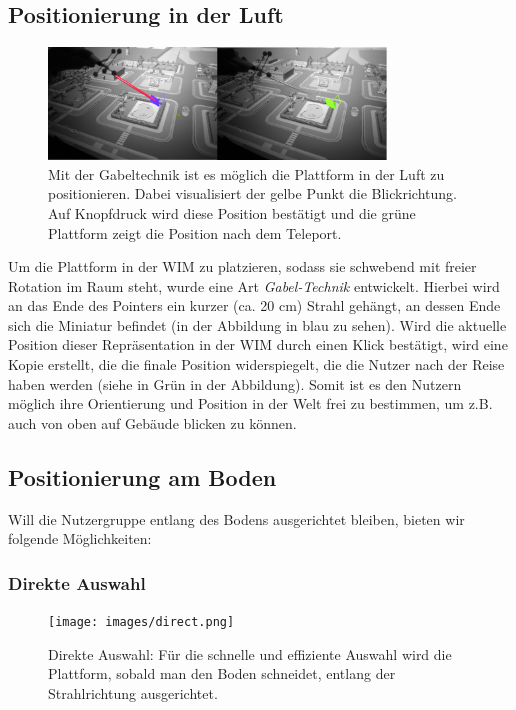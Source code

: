 \subsection{Positionierung in der Luft}

\begin{figure}[h!]
  \centering
  \includegraphics[width=0.8\textwidth]{images/fork.png}
  \caption{Mit der Gabeltechnik ist es möglich die Plattform in der Luft zu positionieren. Dabei visualisiert der gelbe Punkt die Blickrichtung. Auf Knopfdruck wird diese Position bestätigt und die grüne Plattform zeigt die Position nach dem Teleport.}
  \label{fig:todo}
\end{figure}


Um die Plattform in der WIM zu platzieren, sodass sie schwebend mit freier Rotation im Raum steht, wurde eine Art \textit{Gabel-Technik} entwickelt. Hierbei wird an das Ende des Pointers ein kurzer (ca. 20 cm) Strahl gehängt, an dessen Ende sich die Miniatur befindet (in der Abbildung in blau zu sehen). Wird die aktuelle Position dieser Repräsentation in der WIM durch einen Klick bestätigt, wird eine Kopie erstellt, die die finale Position widerspiegelt, die die Nutzer nach der Reise haben werden (siehe in Grün in der Abbildung).
Somit ist es den Nutzern möglich ihre Orientierung und Position in der Welt frei zu bestimmen, um z.B. auch von oben auf Gebäude blicken zu können.


\subsection{Positionierung am Boden}
Will die Nutzergruppe entlang des Bodens ausgerichtet bleiben, bieten wir folgende Möglichkeiten:

\subsubsection{Direkte Auswahl}

\begin{figure}[h]
  \centering
  \texttt{[image: images/direct.png]}
  \caption{Direkte Auswahl: Für die schnelle und effiziente Auswahl wird die Plattform, sobald man den Boden schneidet, entlang der Strahlrichtung ausgerichtet.}
  \label{fig:todo}
\end{figure}

